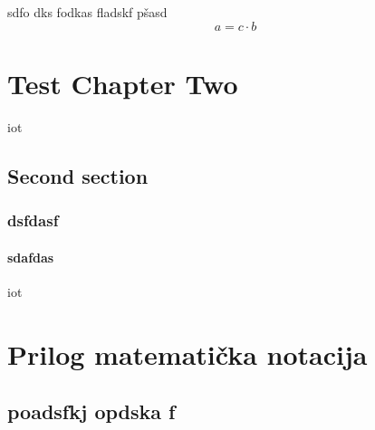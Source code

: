 \documentclass[skripta, fancy]{FSBtex}
\begin{document}
\begin{example}
sdfo dks fodkas fladskf pšasd
\begin{equation}
a = c\cdot b
\end{equation}
\end{example}




\chapter{Test Chapter Two}
\acrlong{iot} \cite{dq_fkm_control}
\section{Second section} 
\subsection{dsfdasf}
\subsubsection{sdafdas}
\acrshort{iot}
\lipsum[5-8]



\LiteratureSettings



\appendix
\chapter{Prilog matematička notacija}
\section{poadsfkj opdska f}
\end{document}

